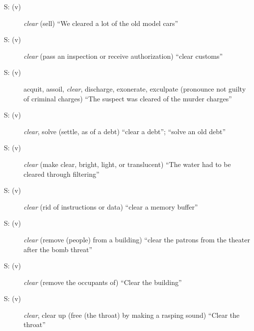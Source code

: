 \begin{description}
  \item [S: (v)] \emph{clear} (sell) ``We cleared a lot of the old model cars''
  \item [S: (v)] \emph{clear} (pass an inspection or receive authorization) ``clear customs''
  \item [S: (v)] acquit, assoil, \emph{clear}, discharge, exonerate, exculpate (pronounce not guilty of criminal charges) ``The suspect was cleared of the murder charges''
  \item [S: (v)] \emph{clear}, solve (settle, as of a debt) ``clear a debt''; ``solve an old debt''
  \item [S: (v)] \emph{clear} (make clear, bright, light, or translucent) ``The water had to be cleared through filtering''
  \item [S: (v)] \emph{clear} (rid of instructions or data) ``clear a memory buffer''
  \item [S: (v)] \emph{clear} (remove (people) from a building) ``clear the patrons from the theater after the bomb threat''
  \item [S: (v)] \emph{clear} (remove the occupants of) ``Clear the building''
  \item [S: (v)] \emph{clear}, clear up (free (the throat) by making a rasping sound) ``Clear the throat''
\end{description}


